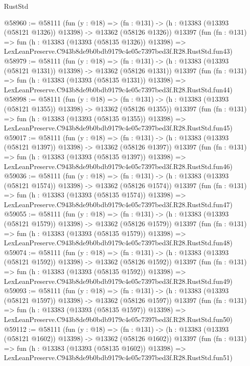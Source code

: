 \begin{lexlean}{RustStd}
\begin{coremodule}
@58960 := @58111
    (fun (y : @18) =>
    (fn : @131) -> (h : @13383 (@13393 (@58121 @1326)) @13398) -> @13362 (@58126 @1326))
    @13397
    (fun (fn : @131) =>
    fun (h : @13383 (@13393 (@58135 @1326)) @13398) =>
    LexLeanPreserve.C943b8de9b0bdb9179c4e05c7397bed3f.R28.RustStd.fun43)
@58979 := @58111
    (fun (y : @18) =>
    (fn : @131) -> (h : @13383 (@13393 (@58121 @1331)) @13398) -> @13362 (@58126 @1331))
    @13397
    (fun (fn : @131) =>
    fun (h : @13383 (@13393 (@58135 @1331)) @13398) =>
    LexLeanPreserve.C943b8de9b0bdb9179c4e05c7397bed3f.R28.RustStd.fun44)
@58998 := @58111
    (fun (y : @18) =>
    (fn : @131) -> (h : @13383 (@13393 (@58121 @1355)) @13398) -> @13362 (@58126 @1355))
    @13397
    (fun (fn : @131) =>
    fun (h : @13383 (@13393 (@58135 @1355)) @13398) =>
    LexLeanPreserve.C943b8de9b0bdb9179c4e05c7397bed3f.R28.RustStd.fun45)
@59017 := @58111
    (fun (y : @18) =>
    (fn : @131) -> (h : @13383 (@13393 (@58121 @1397)) @13398) -> @13362 (@58126 @1397))
    @13397
    (fun (fn : @131) =>
    fun (h : @13383 (@13393 (@58135 @1397)) @13398) =>
    LexLeanPreserve.C943b8de9b0bdb9179c4e05c7397bed3f.R28.RustStd.fun46)
@59036 := @58111
    (fun (y : @18) =>
    (fn : @131) -> (h : @13383 (@13393 (@58121 @1574)) @13398) -> @13362 (@58126 @1574))
    @13397
    (fun (fn : @131) =>
    fun (h : @13383 (@13393 (@58135 @1574)) @13398) =>
    LexLeanPreserve.C943b8de9b0bdb9179c4e05c7397bed3f.R28.RustStd.fun47)
@59055 := @58111
    (fun (y : @18) =>
    (fn : @131) -> (h : @13383 (@13393 (@58121 @1579)) @13398) -> @13362 (@58126 @1579))
    @13397
    (fun (fn : @131) =>
    fun (h : @13383 (@13393 (@58135 @1579)) @13398) =>
    LexLeanPreserve.C943b8de9b0bdb9179c4e05c7397bed3f.R28.RustStd.fun48)
@59074 := @58111
    (fun (y : @18) =>
    (fn : @131) -> (h : @13383 (@13393 (@58121 @1592)) @13398) -> @13362 (@58126 @1592))
    @13397
    (fun (fn : @131) =>
    fun (h : @13383 (@13393 (@58135 @1592)) @13398) =>
    LexLeanPreserve.C943b8de9b0bdb9179c4e05c7397bed3f.R28.RustStd.fun49)
@59093 := @58111
    (fun (y : @18) =>
    (fn : @131) -> (h : @13383 (@13393 (@58121 @1597)) @13398) -> @13362 (@58126 @1597))
    @13397
    (fun (fn : @131) =>
    fun (h : @13383 (@13393 (@58135 @1597)) @13398) =>
    LexLeanPreserve.C943b8de9b0bdb9179c4e05c7397bed3f.R28.RustStd.fun50)
@59112 := @58111
    (fun (y : @18) =>
    (fn : @131) -> (h : @13383 (@13393 (@58121 @1602)) @13398) -> @13362 (@58126 @1602))
    @13397
    (fun (fn : @131) =>
    fun (h : @13383 (@13393 (@58135 @1602)) @13398) =>
    LexLeanPreserve.C943b8de9b0bdb9179c4e05c7397bed3f.R28.RustStd.fun51)

\end{coremodule}
\end{lexlean}
